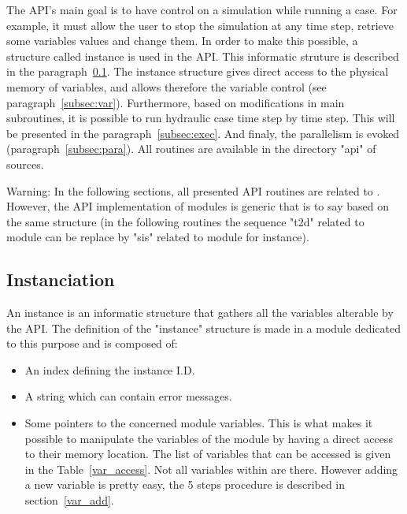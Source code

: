 The API’s main goal is to have control on a simulation while running a case.
For example, it must allow the user to stop the simulation at any time step,
retrieve some variables values and change them. In order to make this possible,
a \fortran structure called instance is used in the API\@. This informatic
struture is described in the paragraph~\ref{subsec:instan}. The instance
structure gives direct access to the physical memory of variables, and allows
therefore the variable control (see paragraph~\ref{subsec:var}). Furthermore,
based on modifications in \telemacsystem main subroutines, it is possible to
run hydraulic case time step by time step. This will be
presented in the paragraph~\ref{subsec:exec}. And finaly, the parallelism is
evoked (paragraph~\ref{subsec:para}).
All \fortran routines are available in the directory "api" of \telemacsystem
sources.

\begin{WarningBlock}{Warning:}
\centering
 In the following sections, all presented API routines are related to
 . However, the API implementation of \telemacsystem modules is
 generic that is to say based on the same structure (in the following routines
 the sequence "t2d" related to  module can be replace by "sis"
 related to \sisyphe module for instance).
\end{WarningBlock}

\subsection{Instanciation}
\label{subsec:instan}
An instance is an informatic structure that gathers all the variables alterable
by the API\@. The definition of the "instance" structure is made in a \fortran
module dedicated to this purpose and is composed of:

\begin{itemize}
\item An index defining the instance I.D.
\item A string which can contain error messages.
\item Some pointers to the concerned module variables. This is what makes it
  possible to manipulate the variables of the module by having a direct access
  to their memory location. The list of variables that can be accessed is given
  in the Table~\ref{var_access}. Not all variables within  are
  there. However adding a new variable is pretty easy, the 5 steps procedure is
  described in section~\ref{var_add}.
\end{itemize}

